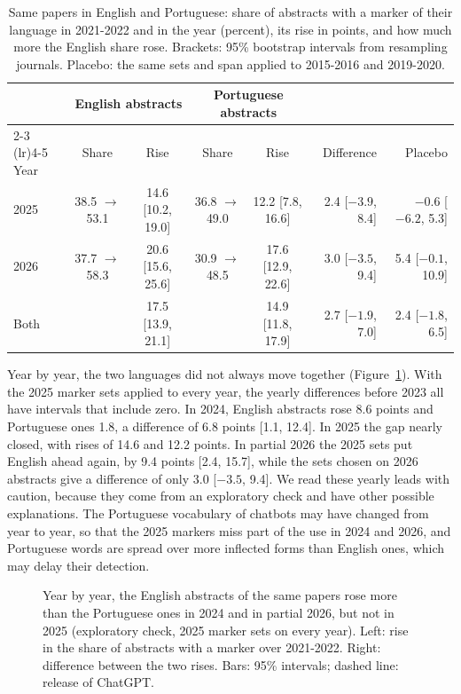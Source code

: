 \documentclass[12pt]{article}
\begin{document}
\begin{table}[!htb]
  \centering
  \caption{Same papers in English and Portuguese: share of abstracts with a marker of their
    language in 2021-2022 and in the year (percent), its rise in points, and how much more the
    English share rose. Brackets: 95\% bootstrap intervals from resampling journals. Placebo: the
    same sets and span applied to 2015-2016 and 2019-2020.}
  \label{tab:h2}
  \footnotesize
  \setlength{\tabcolsep}{3pt}
  \begin{tabular}{lccccrr}
    \toprule
    & \multicolumn{2}{c}{English abstracts} & \multicolumn{2}{c}{Portuguese abstracts} & & \\
    \cmidrule(lr){2-3} \cmidrule(lr){4-5}
    Year & Share & Rise & Share & Rise & Difference & Placebo \\
    \midrule
    2025      & 38.5 $\to$ 53.1 & 14.6 [10.2, 19.0] & 36.8 $\to$ 49.0 & 12.2 [7.8, 16.6]
              & 2.4 [$-3.9$, 8.4] & $-0.6$ [$-6.2$, 5.3] \\
    2026      & 37.7 $\to$ 58.3 & 20.6 [15.6, 25.6] & 30.9 $\to$ 48.5 & 17.6 [12.9, 22.6]
              & 3.0 [$-3.5$, 9.4] & 5.4 [$-0.1$, 10.9] \\
    Both      &                 & 17.5 [13.9, 21.1] &                 & 14.9 [11.8, 17.9]
              & 2.7 [$-1.9$, 7.0] & 2.4 [$-1.8$, 6.5] \\
    \bottomrule
  \end{tabular}
\end{table}

Year by year, the two languages did not always move together (Figure~\ref{fig:same-paper}). With
the 2025 marker sets applied to every year, the yearly differences before 2023 all have intervals
that include zero. In 2024, English abstracts rose 8.6 points and Portuguese ones 1.8, a difference
of 6.8 points [1.1, 12.4]. In 2025 the gap nearly closed, with rises of 14.6 and 12.2 points. In
partial 2026 the 2025 sets put English ahead again, by 9.4 points [2.4, 15.7], while the sets
chosen on 2026 abstracts give a difference of only 3.0 [$-3.5$, 9.4]. We read these yearly leads
with caution, because they come from an exploratory check and have other possible explanations. The
Portuguese vocabulary of chatbots may have changed from year to year, so that the 2025 markers miss
part of the use in 2024 and 2026, and Portuguese words are spread over more inflected forms than
English ones, which may delay their detection.

\begin{figure}[!htb]
  \centering
  
  \caption{Year by year, the English abstracts of the same papers rose more than the Portuguese ones
    in 2024 and in partial 2026, but not in 2025 (exploratory check, 2025 marker sets on every
    year). Left: rise in the share of abstracts with a marker over 2021-2022. Right: difference
    between the two rises. Bars: 95\% intervals; dashed line: release of ChatGPT.}
  \label{fig:same-paper}
\end{figure}
\end{document}
